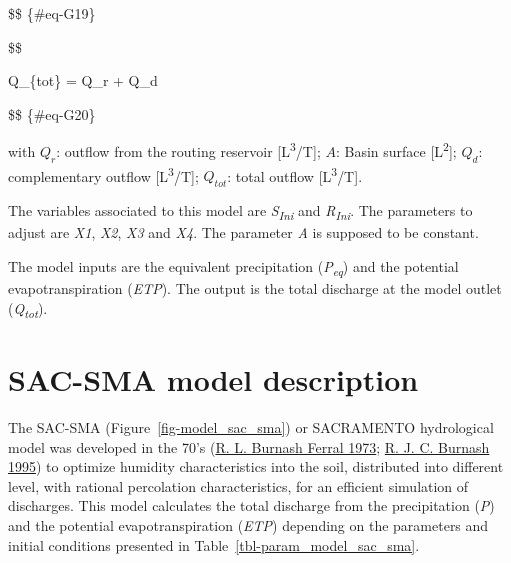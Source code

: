 \documentclass[
  letterpaper,
  DIV=11,
  numbers=noendperiod]{scrreprt}
\begin{document}
\$\$ \{\#eq-G19\}

\$\$

Q\_\{tot\} = Q\_r + Q\_d

\$\$ \{\#eq-G20\}

with \(Q_r\): outflow from the routing reservoir
{[}L\textsuperscript{3}/T{]}; \(A\): Basin surface
{[}L\textsuperscript{2}{]}; \(Q_d\): complementary outflow
{[}L\textsuperscript{3}/T{]}; \(Q_{tot}\): total outflow
{[}L\textsuperscript{3}/T{]}.

The variables associated to this model are \emph{S\textsubscript{Ini}}
and \emph{R\textsubscript{Ini}}. The parameters to adjust are \emph{X1},
\emph{X2}, \emph{X3} and \emph{X4}. The parameter \emph{A} is supposed
to be constant.

The model inputs are the equivalent precipitation
(\emph{P\textsubscript{eq}}) and the potential evapotranspiration
(\emph{ETP}). The output is the total discharge at the model outlet
(\emph{Q\textsubscript{tot}}).

\hypertarget{sec-model_sac_sma}{%
\chapter{SAC-SMA model description}\label{sec-model_sac_sma}}

The SAC-SMA (Figure~\ref{fig-model_sac_sma}) or SACRAMENTO hydrological
model was developed in the 70's
(\protect\hyperlink{ref-burnash_generalized_1973}{R. L. Burnash Ferral
1973}; \protect\hyperlink{ref-burnash_nws_1995}{R. J. C. Burnash 1995})
to optimize humidity characteristics into the soil, distributed into
different level, with rational percolation characteristics, for an
efficient simulation of discharges. This model calculates the total
discharge from the precipitation (\emph{P}) and the potential
evapotranspiration (\emph{ETP}) depending on the parameters and initial
conditions presented in Table~\ref{tbl-param_model_sac_sma}.
\end{document}
